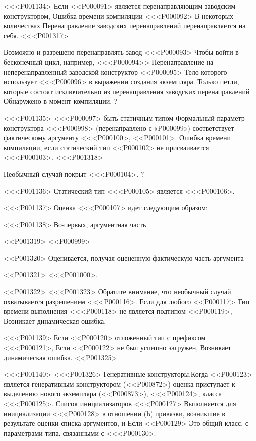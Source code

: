 {{{{{{{{{{{{{{{{{<<<P001134>%
Если <<P000091> является перенаправляющим заводским конструктором,
Ошибка времени компиляции <<<P000092> В некоторых количествах
Перенаправление заводских перенаправлений перенаправляется на себя.
<<<P001317>{%
Возможно и разрешено перенаправлять завод <<<P000093>
Чтобы войти в бесконечный цикл, например,
<<<P000094>> Перенаправление на неперенаправленный заводской конструктор
<<P000095> Тело которого использует <<<P000096> в выражении создания экземпляра.
Только петли, которые состоят исключительно из перенаправления заводских перенаправлений
Обнаружено в момент компиляции.%
?

<<<P001135>%
<<<P000097> быть статичным типом
Формальный параметр конструктора <<<P000998> (перенаправлено с «P000099»)
соответствует фактическому аргументу <<<P000100>, <<P000101>.
Ошибка времени компиляции, если статический тип
<<P000102>
не присваивается <<<P000103>.
<<<P001318>{%
Необычный случай покрыт <<<P000104>.%
?

<<<P001136>%
Статический тип <<<P000105> является <<<P000106>.

<<<P001137>%
Оценка <<<P000107> идет следующим образом:

<<<P001138>%
Во-первых, аргументная часть

<<P001319>
<<P000999>

<<P001320>
Оценивается, получая оцененную фактическую часть аргумента

<<P001321>
<<<P001000>.

<<P001322>
<<<P001323> Обратите внимание, что необычный случай охватывается разрешением <<<P000116>.
Если для любого
<<P000117>
Тип времени выполнения <<<P000118> не является подтипом
<<P000119>,
Возникает динамическая ошибка.

<<<P001139>%
Если <<P000120> отложенный тип с префиксом <<<P000121>,
Если <<P000122> не был успешно загружен,
Возникает динамическая ошибка.
<<P001325>

<<<P001140>%
<<<P001326> Генеративные конструкторы.Когда <<P000123> является генеративным конструктором
(<<P000872>)
оценка приступает к выделению нового экземпляра
(<<P000873>), <<<P000124>, класса <<<P000125>.
Список инициализаторов %
<<<P000127> Выполняется для инициализации <<<P000128> в отношении
(b) привязки, возникшие в результате оценки списка аргументов, и
Если <<P000129> Это общий класс,
с параметрами типа, связанными с <<<P000130>.

}}}}}}}}}}}}}}}}}}}
